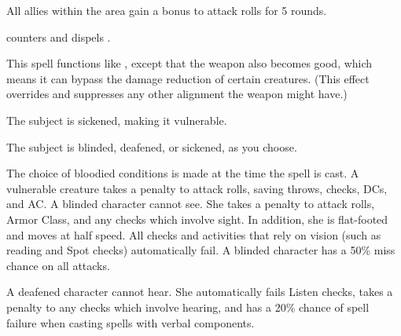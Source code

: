 \begin{spelleffect}
  All allies within the area gain a  bonus to attack rolls for 5 rounds. \bonusscalingdescription
\end{spelleffect}
\begin{spellnotes}
   counters and dispels .
\end{spellnotes}

\begin{spelleffect}
  This spell functions like , except that the weapon also becomes good, which means it can bypass the damage reduction of certain creatures. (This effect overrides and suppresses any other alignment the weapon might have.)
\end{spelleffect}

\begin{spellhealthy}
  The subject is sickened, making it vulnerable.
\end{spellhealthy}
\begin{spellblood}
  The subject is blinded, deafened, or sickened, as you choose.
\end{spellblood}
\begin{spellnotes}
   The choice of bloodied conditions is made at the time the spell is cast. A vulnerable creature takes a  penalty to attack rolls, saving throws, checks, DCs, and AC. A blinded character cannot see. She takes a  penalty to attack rolls, Armor Class, and any checks which involve sight. In addition, she is flat-footed and moves at half speed. All checks and activities that rely on vision (such as reading and Spot checks) automatically fail. A blinded character has a 50\% miss chance on all attacks.

  A deafened character cannot hear. She automatically fails Listen checks, takes a  penalty to any checks which involve hearing, and has a 20\% chance of spell failure when casting spells with verbal components.
  

\end{spellnotes}

